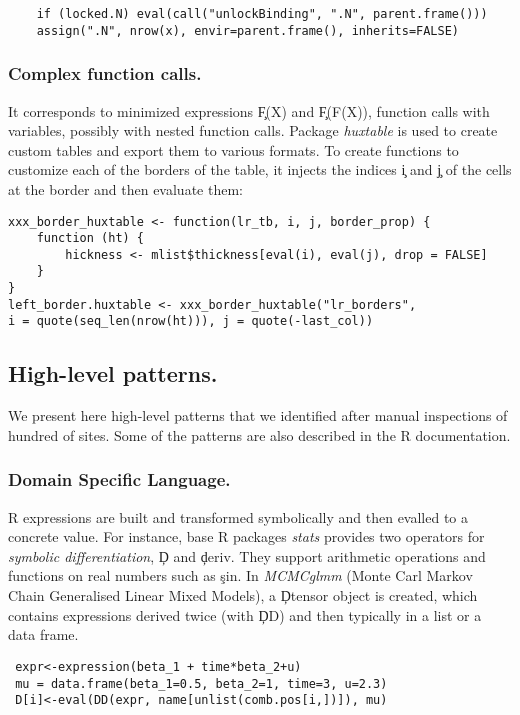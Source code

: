 \documentclass[review,screen,acmsmall,anonymous=true]{acmart}
\begin{document}
\begin{lstlisting}
	if (locked.N) eval(call("unlockBinding", ".N", parent.frame()))  
	assign(".N", nrow(x), envir=parent.frame(), inherits=FALSE)
\end{lstlisting}

\subsubsection{Complex function calls.} It corresponds to minimized expressions \c{F(X)} and \c{F(F(X))}, \ie function calls with variables, possibly with nested function calls. Package \emph{huxtable} is used to create custom tables and export them to various formats. To create functions to customize each of the borders of the table, it injects the indices \c{i} and \c{j} of the cells at the border and then evaluate them:
\begin{lstlisting}
xxx_border_huxtable <- function(lr_tb, i, j, border_prop) {
	function (ht) {
		hickness <- mlist$thickness[eval(i), eval(j), drop = FALSE]
	}
}
left_border.huxtable <- xxx_border_huxtable("lr_borders",
i = quote(seq_len(nrow(ht))), j = quote(-last_col))
\end{lstlisting}

\subsection{High-level patterns.}

We present here high-level patterns that we identified after manual inspections of hundred of \eval sites. Some of the patterns are also described in the R documentation.

\subsubsection{Domain Specific Language.} R expressions are built and transformed symbolically and then evalled to a concrete value. For instance,   base R packages \emph{stats} provides two operators for \emph{symbolic differentiation}, \c{D} and \c{deriv}. They support arithmetic operations and functions on real numbers such as \c{sin}.
In \emph{MCMCglmm} (Monte Carl Markov Chain Generalised Linear Mixed Models), a \c{Dtensor} object is created, which contains expressions derived twice (with \c{DD}) and then typically in a list or a data frame.
\begin{lstlisting}
 expr<-expression(beta_1 + time*beta_2+u)
 mu = data.frame(beta_1=0.5, beta_2=1, time=3, u=2.3)
 D[i]<-eval(DD(expr, name[unlist(comb.pos[i,])]), mu)
\end{lstlisting}
\end{document}
